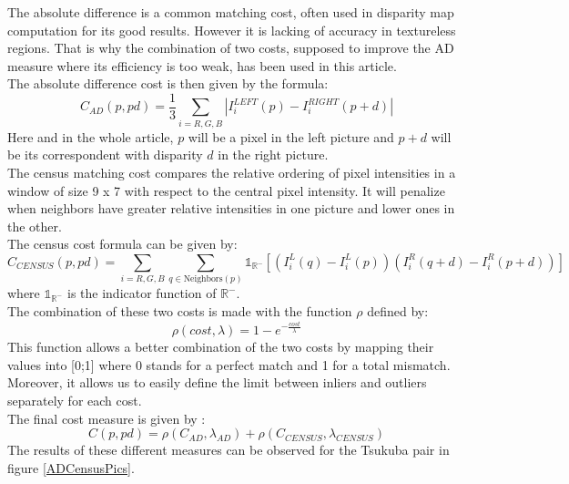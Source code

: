 \documentclass{article}
\begin{document}
The absolute difference is a common matching cost, often used in disparity map computation for its good results. However it is lacking of accuracy in textureless regions. That is why the combination of two costs, supposed to improve the AD measure where its efficiency is too weak, has been used in this article.\\
The absolute difference cost is then given by the formula:
\[
	C_{AD}(p, pd) = \frac{1}{3} \sum_{i = R, G, B}  | I_i^{LEFT}(p) - I_i^{RIGHT}(p+d) | 
\]
Here and in the whole article, $p$ will be a pixel in the left picture and $p + d$ will be its correspondent with disparity $d$ in the right picture.\\
The census matching cost compares the relative ordering of pixel intensities in a window of size 9 x 7 with respect to the central pixel intensity. It will penalize when neighbors have greater relative intensities in one picture and lower ones in the other.\\
The census cost formula can be given by:
\[
	C_{CENSUS}(p, pd) = \sum_{i = R, G, B} \sum_{q \in \text{Neighbors}(p)} \mathds{1}_{\mathbb{R}^-}\left[\left(I_i^{L}(q)-I_i^{L}(p)\right)\left(I_i^{R}(q+d)-I_i^{R}(p+d)\right)\right]
\]
where $\mathds{1}_{\mathbb{R}^-}$ is the indicator function of $\mathbb{R}^-$.\\
The combination of these two costs is made with the function $\rho$ defined by:
\[
	\rho(cost, \lambda) = 1 - e^{-\frac{cost}{\lambda}}
\]
This function allows a better combination of the two costs by mapping their values into [0;1] where 0 stands for a perfect match and 1 for a total mismatch. Moreover, it allows us to easily define the limit between inliers and outliers separately for each cost.\\
The final cost measure is given by :
\[
	C(p,pd) = \rho(C_{AD}, \lambda_{AD}) + \rho(C_{CENSUS}, \lambda_{CENSUS})
\]
The results of these different measures can be observed for the Tsukuba pair in figure \ref{ADCensusPics}.
\end{document}
